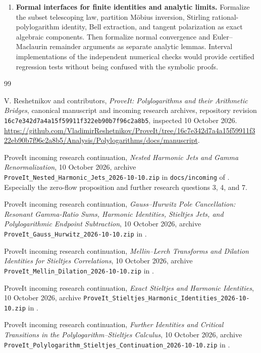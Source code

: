 \documentclass[11pt,letterpaper]{article}
\numberwithin{equation}{section}
\theoremstyle{plain}
\theoremstyle{definition}
\theoremstyle{remark}
\newcommand{\src}[1]{\nolinkurl{#1}}
\begin{document}
\begin{enumerate}[leftmargin=*,label=\textbf{Q\arabic*.},itemsep=8pt]
\item \textbf{Formal interfaces for finite identities and analytic limits.}
Formalize the subset telescoping law, partition M\"obius inversion,
Stirling rational-polylogarithm identity, Bell extraction, and tangent
polarization as exact algebraic components. Then formalize normal
convergence and Euler--Maclaurin remainder arguments as separate
analytic lemmas. Interval implementations of the independent numerical
checks would provide certified regression tests without being confused
with the symbolic proofs.
\end{enumerate}


\begin{thebibliography}{99}

V. Reshetnikov and contributors,
\emph{ProveIt: Polylogarithms and their Arithmetic Bridges}, canonical
manuscript and incoming research archives, repository revision
\src{16c7e342d7a4a15f59911f322eb90b7f96c2a8b5}, inspected
10 October 2026.
\url{https://github.com/VladimirReshetnikov/ProveIt/tree/16c7e342d7a4a15f59911f322eb90b7f96c2a8b5/Analysis/Polylogarithms/docs/manuscript}.

ProveIt incoming research continuation,
\emph{Nested Harmonic Jets and Gamma Renormalization},
10 October 2026, archive
\src{ProveIt_Nested_Harmonic_Jets_2026-10-10.zip} in \src{docs/incoming}
of \cite{repo}. Especially the zero-flow proposition and further
research questions 3, 4, and 7.

ProveIt incoming research continuation,
\emph{Gauss--Hurwitz Pole Cancellation: Resonant Gamma-Ratio Sums,
Harmonic Identities, Stieltjes Jets, and Polylogarithmic Endpoint
Subtraction}, 10 October 2026, archive
\src{ProveIt_Gauss_Hurwitz_2026-10-10.zip} in \cite{repo}.

ProveIt incoming research continuation,
\emph{Mellin--Lerch Transforms and Dilation Identities for Stieltjes
Correlations}, 10 October 2026, archive
\src{ProveIt_Mellin_Dilation_2026-10-10.zip} in \cite{repo}.

ProveIt incoming research continuation,
\emph{Exact Stieltjes and Harmonic Identities}, 10 October 2026,
archive \src{ProveIt_Stieltjes_Harmonic_Identities_2026-10-10.zip}
in \cite{repo}.

ProveIt incoming research continuation,
\emph{Further Identities and Critical Transitions in the
Polylogarithm--Stieltjes Calculus}, 10 October 2026, archive
\src{ProveIt_Polylogarithm_Stieltjes_Continuation_2026-10-10.zip}
in \cite{repo}.


\end{thebibliography}
\end{document}
